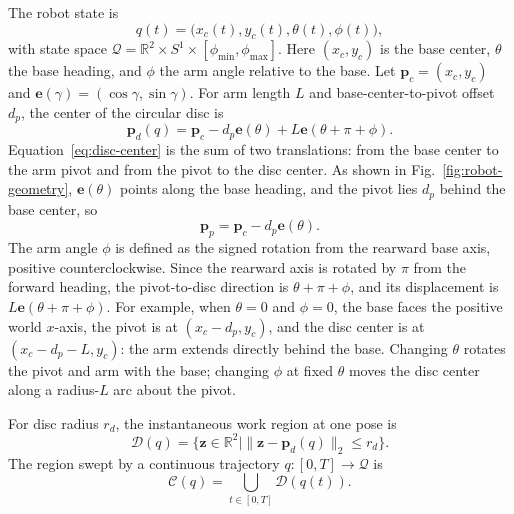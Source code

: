\documentclass[a4paper,11pt]{article}
\begin{document}
The robot state is
\begin{equation*}
q(t)=\bigl(x_c(t),y_c(t),\theta(t),\phi(t)\bigr),
\end{equation*}
with state space $\mathcal Q=\mathbb R^2\times S^1\times[\phi_{\min},\phi_{\max}]$. Here $(x_c,y_c)$ is the base center, $\theta$ the base heading, and $\phi$ the arm angle relative to the base. Let $\mathbf p_c=(x_c,y_c)$ and $\mathbf e(\gamma)=(\cos\gamma,\sin\gamma)$. For arm length $L$ and base-center-to-pivot offset $d_p$, the center of the circular disc is
\begin{equation}
\mathbf p_d(q)=\mathbf p_c-d_p\mathbf e(\theta)+L\mathbf e(\theta+\pi+\phi).
\tag{1}
\label{eq:disc-center}
\end{equation}
Equation~\eqref{eq:disc-center} is the sum of two translations: from the base center to the arm pivot and from the pivot to the disc center. As shown in Fig.~\ref{fig:robot-geometry}, $\mathbf e(\theta)$ points along the base heading, and the pivot lies $d_p$ behind the base center, so
\begin{equation*}
\mathbf p_p=\mathbf p_c-d_p\mathbf e(\theta).
\end{equation*}
The arm angle $\phi$ is defined as the signed rotation from the rearward base axis, positive counterclockwise. Since the rearward axis is rotated by $\pi$ from the forward heading, the pivot-to-disc direction is $\theta+\pi+\phi$, and its displacement is $L\mathbf e(\theta+\pi+\phi)$. For example, when $\theta=0$ and $\phi=0$, the base faces the positive world $x$-axis, the pivot is at $(x_c-d_p,y_c)$, and the disc center is at $(x_c-d_p-L,y_c)$: the arm extends directly behind the base. Changing $\theta$ rotates the pivot and arm with the base; changing $\phi$ at fixed $\theta$ moves the disc center along a radius-$L$ arc about the pivot.

For disc radius $r_d$, the instantaneous work region at one pose is
\begin{equation}
\mathcal D(q)=\{\mathbf z\in\mathbb R^2\mid\|\mathbf z-\mathbf p_d(q)\|_2\le r_d\}.
\tag{2}
\label{eq:instantaneous-disc}
\end{equation}
The region swept by a continuous trajectory $q:[0,T]\rightarrow\mathcal Q$ is
\begin{equation}
\mathcal C(q)=\bigcup_{t\in[0,T]}\mathcal D(q(t)).
\tag{3}
\label{eq:swept-area}
\end{equation}
\end{document}
